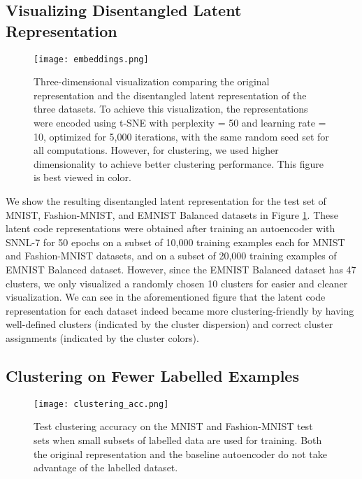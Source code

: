 \documentclass[conference]{IEEEtran}
\begin{document}
\subsection{Visualizing Disentangled Latent Representation}
\begin{figure}[htb!]
    \centering
    \texttt{[image: embeddings.png]}
    \caption{Three-dimensional visualization comparing the original representation and the disentangled latent representation of the three datasets. To achieve this visualization, the representations were encoded using t-SNE with perplexity = 50 and learning rate = 10, optimized for 5,000 iterations, with the same random seed set for all computations. However, for clustering, we used higher dimensionality to achieve better clustering performance. This figure is best viewed in color.}
    \label{fig:embeddings}
\end{figure}
We show the resulting disentangled latent representation for the test set of MNIST, Fashion-MNIST, and EMNIST Balanced datasets in Figure \ref{fig:embeddings}. These latent code representations were obtained after training an autoencoder with SNNL-7 for 50 epochs on a subset of 10,000 training examples each for MNIST and Fashion-MNIST datasets, and on a subset of 20,000 training examples of EMNIST Balanced dataset. However, since the EMNIST Balanced dataset has 47 clusters, we only visualized a randomly chosen 10 clusters for easier and cleaner visualization. We can see in the aforementioned figure that the latent code representation for each dataset indeed became more clustering-friendly by having well-defined clusters (indicated by the cluster dispersion) and correct cluster assignments (indicated by the cluster colors).
\subsection{Clustering on Fewer Labelled Examples}
\begin{figure}[htb]
    \centering
    \texttt{[image: clustering\_acc.png]}
    \caption{Test clustering accuracy on the MNIST and Fashion-MNIST test sets when small subsets of labelled data are used for training. Both the original representation and the baseline autoencoder do not take advantage of the labelled dataset.}
    \label{fig:clustering_acc_varying}
\end{figure}
\end{document}
